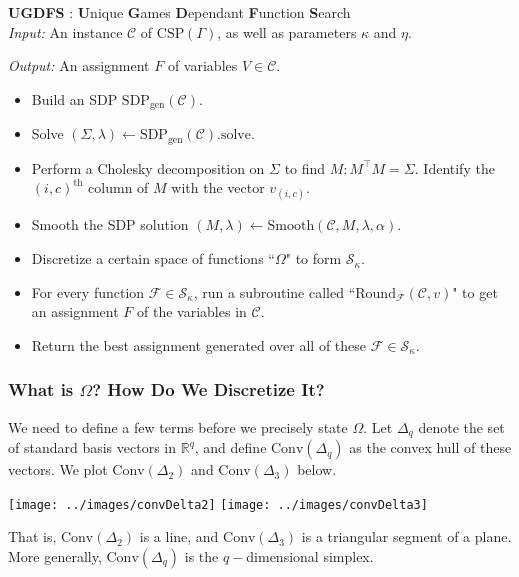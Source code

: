 \begin{algorithm} \textbf{UGDFS} : \textbf{U}nique \textbf{G}ames \textbf{D}ependant \textbf{F}unction \textbf{S}earch \\

\textit{Input: } An instance $\mathcal{C}$ of $\text{CSP}(\Gamma)$, as well as parameters $\kappa$ and $\eta$.

\textit{Output: } An assignment $F$ of variables $V \in \mathcal{C}$.
\begin{itemize}
\item Build an SDP $\text{SDP}_{\text{gen}}(\mathcal{C})$.
\item Solve $(\Sigma,\lambda) \leftarrow \text{SDP}_{\text{gen}}(\mathcal{C}).\text{solve}$.
\item Perform a Cholesky decomposition on $\Sigma$ to find $M : M^\intercal M = \Sigma$. Identify the $(i,c)^{\text{th}}$ column of $M$ with the vector $v_{(i,c)}$.
\item Smooth the SDP solution $(M,\lambda) \leftarrow \text{Smooth}(\mathcal{C},M,\lambda, \alpha)$.
\item Discretize a certain space of functions ``$\Omega$" to form $\mathcal{S}_{\kappa}$.
\item For every function $\mathcal{F} \in \mathcal{S}_{\kappa}$, run a subroutine called ``$\text{Round}_{\mathcal{F}}(\mathcal{C},v)$" to get an assignment $F$ of the variables in $\mathcal{C}$. 
\item Return the best assignment generated over all of these $\mathcal{F} \in \mathcal{S}_{\kappa}$.
\end{itemize}
\end{algorithm}

\subsubsection{What is $\Omega$? How Do We Discretize It?}\label{subsubsec:UGDFS_discretize}
We need to define a few terms before we precisely state $\Omega$. Let $\Delta_q$ denote the set of standard basis vectors in $\mathbb{R}^q$, and define $\text{Conv}(\Delta_q)$ as the convex hull of these vectors. We plot $\text{Conv}(\Delta_2)$ and $\text{Conv}(\Delta_3)$ below.

\begin{center}
\texttt{[image: ../images/convDelta2]} \qquad
\texttt{[image: ../images/convDelta3]}
\end{center}

That is, $\text{Conv}(\Delta_2)$ is a line, and $\text{Conv}(\Delta_3)$ is a triangular segment of a plane. More generally, $\text{Conv}(\Delta_q)$ is the $q-$dimensional simplex.

